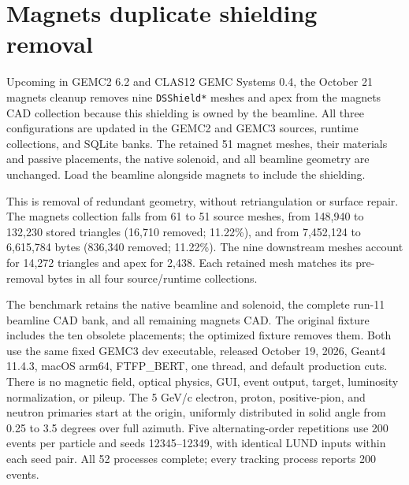 \FloatBarrier
\section{Magnets duplicate shielding removal}
\label{sec:magnets-dedup}

Upcoming in GEMC2 6.2 and CLAS12 GEMC Systems 0.4, the October 21 magnets cleanup removes nine
\texttt{DSShield*} meshes and apex from the magnets CAD collection because this shielding is owned by the
beamline. All three configurations are updated in the GEMC2 and GEMC3 sources, runtime collections, and SQLite
banks. The retained 51 magnet meshes, their materials and passive placements, the native solenoid, and all
beamline geometry are unchanged. Load the beamline alongside magnets to include the shielding.

This is removal of redundant geometry, without retriangulation or surface repair. The magnets collection falls
from 61 to 51 source meshes, from 148,940 to 132,230 stored triangles (16,710 removed; 11.22\%), and from
7,452,124 to 6,615,784 bytes (836,340 removed; 11.22\%). The nine downstream meshes account for 14,272
triangles and apex for 2,438. Each retained mesh matches its pre-removal bytes in all four source/runtime
collections.

The benchmark retains the native beamline and solenoid, the complete run-11 beamline CAD bank, and all
remaining magnets CAD. The original fixture includes the ten obsolete placements; the optimized fixture
removes them. Both use the same fixed GEMC3 dev executable, released October 19, 2026, Geant4 11.4.3, macOS
arm64, FTFP\_BERT, one thread, and default production cuts. There is no magnetic field, optical physics, GUI,
event output, target, luminosity normalization, or pileup. The 5 GeV/c electron, proton, positive-pion, and
neutron primaries start at the origin, uniformly distributed in solid angle from 0.25 to 3.5 degrees over full
azimuth. Five alternating-order repetitions use 200 events per particle and seeds 12345--12349, with identical
LUND inputs within each seed pair. All 52 processes complete; every tracking process reports 200 events.

